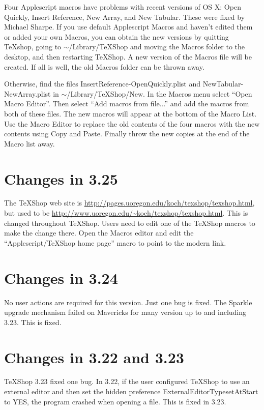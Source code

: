 \documentclass[11pt, oneside]{amsart}
\begin{document}
Four Applescript macros have problems with recent versions of OS X:  Open Quickly, Insert Reference, New Array, and New Tabular. These  were fixed by
Michael Sharpe. If you use 
default Applescript Macros and haven't edited them or added your own Macros, you can obtain
the new versions by quitting TeXshop, going to $\sim$/Library/TeXShop and moving the Macros
folder to the desktop, and then restarting TeXShop. A new version of the Macros file will be
created. If all is well, the old Macros folder can be thrown away.

Otherwise, find the files InsertReference-OpenQuickly.plist and NewTabular-NewArray.plist
in $\sim$/Library/TeXShop/New. In the Macros menu select ``Open Macro Editor''. Then
select ``Add macros from file...'' and add the macros from both of these files. The
new macros will appear at the bottom of the Macro List. Use the Macro Editor to
replace the old contents of the four macros with the new contents using Copy and Paste.
Finally throw the new copies at the end of the Macro list away.

 
\section{Changes in 3.25} 

The TeXShop web site is \url{http://pages.uoregon.edu/koch/texshop/texshop.html}, but used to be \url{http://www.uoregon.edu/~koch/texshop/texshop.html}. This is changed throughout TeXShop. Users need to edit one of the TeXShop macros to make the change there. Open the Macros editor and edit the 
``Applescript/TeXShop home page'' macro to point to the modern link.
 
\section{Changes in 3.24}

No user actions are required for this version. Just one bug is fixed. The Sparkle
upgrade mechanism failed on Mavericks for many version up to and including 3.23. This
is fixed.

\section{Changes in 3.22 and 3.23}

TeXShop 3.23 fixed one bug. In 3.22, if the user configured TeXShop to use an external editor
and then set the hidden preference ExternalEditorTypesetAtStart to YES,  the program crashed when opening a file. This is fixed in 3.23.
\end{document}
